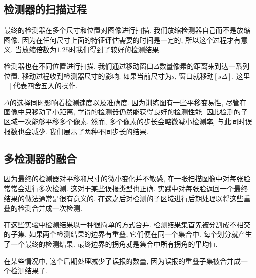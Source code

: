 \documentclass[a4paper,utf8,11pt]{ctexart}
\begin{document}
\subsection{检测器的扫描过程}
最终的检测器在多个尺寸和位置对图像进行扫描. 我们放缩检测器自己而不是放缩图像. 因为在任何尺寸上面的特征评估需要的时间是一定的, 所以这个过程才有意义. 当放缩倍数为$1.25$时我们得到了较好的检测结果.

检测器也在不同位置进行扫描. 我们通过移动窗口$\Delta$数量像素的距离来到达一系列位置. 移动过程收到检测器尺寸的影响: 如果当前尺寸为$s$, 窗口就移动$[s\Delta]$, 这里$[]$代表四舍五入的操作.

$\Delta$的选择同时影响着检测速度以及准确度. 因为训练图有一些平移变易性, 尽管在图像中只移动了小距离, 学得的检测器仍然能获得良好的检测性能. 因此检测的子区域一次能够平移多个像素.
然而, 多个像素的步长会略微减小检测率, 与此同时误报数也会减少. 我们展示了两种不同步长的结果.

\subsection{多检测器的融合}
因为最终的检测器对平移和尺寸的微小变化并不敏感, 在一张扫描图像中对每张脸常常会进行多次检测. 这对于某些误报类型也正确. 实践中对每张脸返回一个最终结果的做法通常是很有意义的. 在这之后对检测的子区域进行后期处理以将这些重叠的检测合并成一次检测.

在这些实验中检测结果以一种很简单的方式合并. 检测结果集首先被分割成不相交的子集. 如果两个检测结果的边界有重叠, 它们便在同一个集合中. 每个划分就产生了一个最终的检测结果. 最终边界的拐角就是集合中所有拐角的平均值.

在某些情况中, 这个后期处理减少了误报的数量, 因为误报的重叠子集被合并成一个检测结果了.
\end{document}

